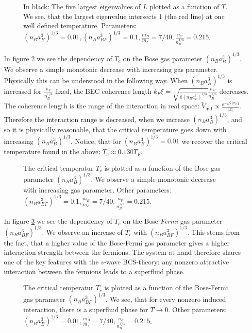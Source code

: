 \begin{figure} 
\begin{center}  
  
\caption{In black: The five largest eigenvalues of $L$ plotted as a function of $T$. We see, that the largest eigenvalue intersects 1 (the red line) at one well defined temperature. Parameters: $(n_Ba_{B}^3)^{1/3} = 0.01, (n_Ba_{BF}^3)^{1/3} = 0.1, \frac{m_B}{m_F} = 7/40, \frac{n_F}{n_B^{1/3}} = 0.215$. }
\label{fig.TCeigenvalues}  
\end{center}    
\end{figure}


In figure \ref{fig.TCrB} we see the dependency of $T_c$ on the Bose gas parameter $(n_Ba_B^3)^{1/3}$. We observe a simple monotonic decrease with increasing gas parameter. Physically this can be understood in the following way. When $(n_Ba_B^3)^{1/3}$ is increased for $\frac{n_F}{n_B^{1/3}}$ fixed, the BEC coherence length $k_F\xi = \sqrt{ \frac{\pi}{ 8(n_Ba_B^3)^{1/3} } }\frac{ n_F }{ n_B^{1/3} }$ decreases. The coherence length is the range of the interaction in real space: $\tilde{V}_{\text{ind}} \propto \frac{ \text{e}^{ -\sqrt{2}|x|/\xi } } {|x|}$. Therefore the interaction range is decreased, when we increase $(n_Ba_B^3)^{1/3}$, and so it is physically reasonable, that the critical temperature goes down with increasing $(n_Ba_B^3)^{1/3}$. Notice, that for $(n_Ba_{B}^3)^{1/3} = 0.01$ we recover the critical temperature found in the above: $T_c \approx 0.130 T_F$. 

\begin{figure} 
\begin{center}  
  
\caption{The critical temperatur $T_c$ is plotted as a function of the Bose gas parameter $(n_Ba_B^3)^{1/3}$. We observe a simple monotonic decrease with increasing gas parameter. Other parameters: $(n_Ba_{BF}^3)^{1/3} = 0.1, \frac{m_B}{m_F} = 7/40, \frac{n_F}{n_B^{1/3}} = 0.215$. }  
\label{fig.TCrB}  
\end{center}    
\end{figure}

In figure \ref{fig.TCrBF} we see the dependency of $T_c$ on the Bose-\textit{Fermi} gas parameter $(n_Ba_{BF}^3)^{1/3}$. We observe an increase of $T_c$ with $(n_Ba_{BF}^3)^{1/3}$. This stems from the fact, that a higher value of the Bose-Fermi gas parameter gives a higher interaction strength between the fermions. The system at hand therefore shares one of the key features with the $s$-wave BCS-theory: any nonzero attractive interaction between the fermions leads to a superfluid phase. 

\begin{figure} 
\begin{center}  
  
\caption{The critical temperatur $T_c$ is plotted as a function of the Bose-Fermi gas parameter $(n_Ba_{BF}^3)^{1/3}$. We see, that for every nonzero induced interaction, there is a superfluid phase for $T\to 0$. Other parameters: $(n_Ba_{B}^3)^{1/3} = 0.01, \frac{m_B}{m_F} = 7/40, \frac{n_F}{n_B^{1/3}} = 0.215$. }  
\label{fig.TCrBF}  
\end{center}    
\end{figure}



